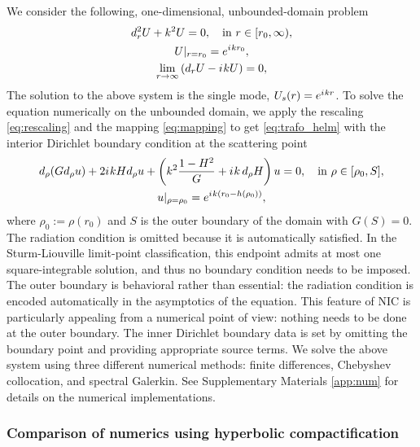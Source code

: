 \documentclass[onefignum,onetabnum]{siamart190516}
\newcommand{\SM}{Supplementary Materials }
\newcommand{\be}{\begin{equation}}
\newcommand{\ee}{\end{equation}}
\newcommand{\iu}{{i\mkern1mu}}
\begin{document}
We consider the following, one-dimensional, unbounded-domain problem 
\begin{equation}
	\label{eq:oneD}
	\begin{gathered}
		d_r^2 U + k^2 U = 0, \quad \mathrm{in} \ r\in[r_0,\infty),\\
		U|_{r=r_0} = e^{\iu k r_0},\\
		\lim_{r\to\infty} \left(d_r U - \iu k U\right) = 0,
	\end{gathered}
\end{equation}
The solution to the above system is the single mode, $U_s(r) = e^{\iu k r}$. To solve the equation numerically on the unbounded domain, we apply the rescaling \eqref{eq:rescaling} and the mapping \eqref{eq:mapping} to get \eqref{eq:trafo_helm} with the interior Dirichlet boundary condition at the scattering point
\be\label{eq:hyp_1d}
	\begin{gathered}
	d_\rho (G d_\rho u) + 2 \iu k H d_\rho u + \left(k^2 \frac{1-H^2}{G} + \iu k \, d_\rho H \right) u = 0, \quad \mathrm{in} \ \rho \in [\rho_0,S],\\
	u|_{\rho=\rho_0} = e^{\iu k (r_0-h(\rho_0))},
	\end{gathered}
\ee
where $\rho_0 := \rho(r_0)$ and $S$ is the outer boundary of the domain with $G(S)=0$. The radiation condition is omitted because it is automatically satisfied. In the Sturm-Liouville limit-point classification, this endpoint admits at most one square-integrable solution, and thus no boundary condition needs to be imposed. The outer boundary is behavioral rather than essential: the radiation condition is encoded automatically in the asymptotics of the equation. This feature of NIC is particularly appealing from a numerical point of view: nothing needs to be done at the outer boundary. The inner Dirichlet boundary data is set by omitting the boundary point and providing appropriate source terms. We solve the above system using three different numerical methods: finite differences, Chebyshev collocation, and spectral Galerkin. See \SM \ref{app:num} for details on the numerical implementations.

\subsubsection{Comparison of numerics using hyperbolic compactification}
\end{document}

